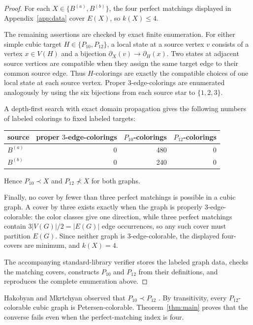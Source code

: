 \documentclass[11pt]{amsart}
\newcommand{\Pten}{P_{10}}
\newcommand{\Ptwelve}{P_{12}}
\newcommand{\Ba}{B^{(a)}}
\newcommand{\Bb}{B^{(b)}}
\begin{document}
\begin{proof}
For each $X\in\{\Ba,\Bb\}$, the four perfect matchings displayed in
Appendix~\ref{app:data} cover $E(X)$, so $k(X)\leq4$.

The remaining assertions are checked by exact finite enumeration. For either
simple cubic target $H\in\{\Pten,\Ptwelve\}$, a local state at a source vertex
$v$ consists of a vertex $x\in V(H)$ and a bijection
$\partial_X(v)\to\partial_H(x)$. Two states at adjacent source vertices are
compatible when they assign the same target edge to their common source edge.
Thus $H$-colorings are exactly the compatible choices of one local state at
each source vertex. Proper $3$-edge-colorings are enumerated analogously by
using the six bijections from each source star to $\{1,2,3\}$.

A depth-first search with exact domain propagation gives the following numbers
of labeled colorings to fixed labeled targets:
\begin{center}
\begin{tabular}{lrrr}
\toprule
source & proper $3$-edge-colorings & $\Pten$-colorings & $\Ptwelve$-colorings\\
\midrule
$\Ba$ & 0 & 480 & 0\\
$\Bb$ & 0 & 240 & 0\\
\bottomrule
\end{tabular}
\end{center}
Hence $\Pten\prec X$ and $\Ptwelve\not\prec X$ for both graphs.

Finally, no cover by fewer than three perfect matchings is possible in a
cubic graph. A cover by three exists exactly when the graph is properly
$3$-edge-colorable: the color classes give one direction, while three perfect
matchings contain $3|V(G)|/2=|E(G)|$ edge occurrences, so any such cover must
partition $E(G)$. Since neither graph is $3$-edge-colorable, the displayed
four-covers are minimum, and $k(X)=4$.

The accompanying standard-library verifier stores the labeled graph data,
checks the matching covers, constructs $\Pten$ and $\Ptwelve$ from their
definitions, and reproduces the complete enumeration above.
\end{proof}

Hakobyan and Mkrtchyan observed that $\Pten\prec\Ptwelve$
\cite{HakobyanMkrtchyan2019}. By transitivity, every $P_{12}$-colorable cubic
graph is Petersen-colorable. Theorem~\ref{thm:main} proves that the converse
fails even when the perfect-matching index is four.
\end{document}
